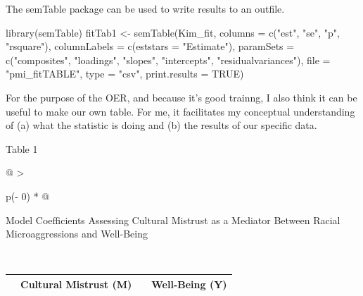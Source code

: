 \documentclass[
]{book}
\newenvironment{Shaded}{\begin{snugshade}}{\end{snugshade}}
\newcommand{\AttributeTok}[1]{\textcolor[rgb]{0.77,0.63,0.00}{#1}}
\newcommand{\ConstantTok}[1]{\textcolor[rgb]{0.00,0.00,0.00}{#1}}
\newcommand{\FunctionTok}[1]{\textcolor[rgb]{0.00,0.00,0.00}{#1}}
\newcommand{\NormalTok}[1]{#1}
\newcommand{\OtherTok}[1]{\textcolor[rgb]{0.56,0.35,0.01}{#1}}
\newcommand{\StringTok}[1]{\textcolor[rgb]{0.31,0.60,0.02}{#1}}
\begin{document}
The semTable package can be used to write results to an outfile.

\begin{Shaded}
\begin{Highlighting}[]
\FunctionTok{library}\NormalTok{(semTable)}
\NormalTok{fitTab1 }\OtherTok{\textless{}{-}} \FunctionTok{semTable}\NormalTok{(Kim\_fit, }\AttributeTok{columns =} \FunctionTok{c}\NormalTok{(}\StringTok{"est"}\NormalTok{, }\StringTok{"se"}\NormalTok{, }\StringTok{"p"}\NormalTok{, }\StringTok{"rsquare"}\NormalTok{),  }\AttributeTok{columnLabels =} \FunctionTok{c}\NormalTok{(}\AttributeTok{eststars =} \StringTok{"Estimate"}\NormalTok{), }\AttributeTok{paramSets =} \FunctionTok{c}\NormalTok{(}\StringTok{"composites"}\NormalTok{, }\StringTok{"loadings"}\NormalTok{, }\StringTok{"slopes"}\NormalTok{, }\StringTok{"intercepts"}\NormalTok{, }\StringTok{"residualvariances"}\NormalTok{), }\AttributeTok{file =} \StringTok{"pmi\_fitTABLE"}\NormalTok{, }\AttributeTok{type =} \StringTok{"csv"}\NormalTok{, }\AttributeTok{print.results =} \ConstantTok{TRUE}\NormalTok{)}
\end{Highlighting}
\end{Shaded}

For the purpose of the OER, and because it's good trainng, I also think it can be useful to make our own table. For me, it facilitates my conceptual understanding of (a) what the statistic is doing and (b) the results of our specific data.

Table 1

\begin{longtable}[]{@{}
  >{\raggedright\arraybackslash}p{(\columnwidth - 0\tabcolsep) * }@{}}
\toprule
\begin{minipage}[b]{\linewidth}\raggedright
Model Coefficients Assessing Cultural Mistrust as a Mediator Between Racial Microaggressions and Well-Being
\end{minipage} \\
\midrule
\endhead
\bottomrule
\end{longtable}

\begin{longtable}[]{@{}
  >{\raggedright\arraybackslash}p{}
  >{\centering\arraybackslash}p{}
  >{\centering\arraybackslash}p{}
  >{\centering\arraybackslash}p{}@{}}
\toprule
\endhead
& Cultural Mistrust (M) & & Well-Being (Y) \\
\bottomrule
\end{longtable}
\end{document}
